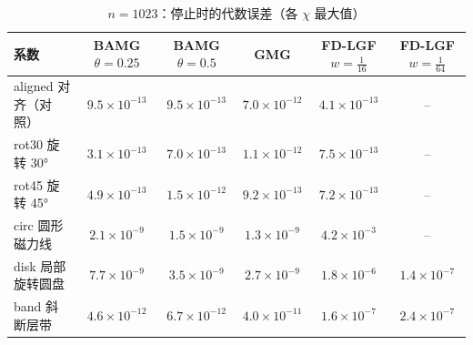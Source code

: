 \begin{table}[H]\centering\small
\caption{$n=1023$：停止时的代数误差（各 $\chi$ 最大值）}\label{tab:err}
\begin{tabular}{lccccc}
\toprule
系数 & BAMG $\theta{=}0.25$ & BAMG $\theta{=}0.5$ & GMG & FD-LGF $w{=}\frac1{16}$ & FD-LGF $w{=}\frac1{64}$ \\
\midrule
aligned 对齐（对照） & $9.5{\times}10^{-13}$ & $9.5{\times}10^{-13}$ & $7.0{\times}10^{-12}$ & $4.1{\times}10^{-13}$ & -- \\
rot30 旋转 30° & $3.1{\times}10^{-13}$ & $7.0{\times}10^{-13}$ & $1.1{\times}10^{-12}$ & $7.5{\times}10^{-13}$ & -- \\
rot45 旋转 45° & $4.9{\times}10^{-13}$ & $1.5{\times}10^{-12}$ & $9.2{\times}10^{-13}$ & $7.2{\times}10^{-13}$ & -- \\
circ 圆形磁力线 & $2.1{\times}10^{-9}$ & $1.5{\times}10^{-9}$ & $1.3{\times}10^{-9}$ & $4.2{\times}10^{-3}$ & -- \\
disk 局部旋转圆盘 & $7.7{\times}10^{-9}$ & $3.5{\times}10^{-9}$ & $2.7{\times}10^{-9}$ & $1.8{\times}10^{-6}$ & $1.4{\times}10^{-7}$ \\
band 斜断层带 & $4.6{\times}10^{-12}$ & $6.7{\times}10^{-12}$ & $4.0{\times}10^{-11}$ & $1.6{\times}10^{-7}$ & $2.4{\times}10^{-7}$ \\
\bottomrule
\end{tabular}
\end{table}

